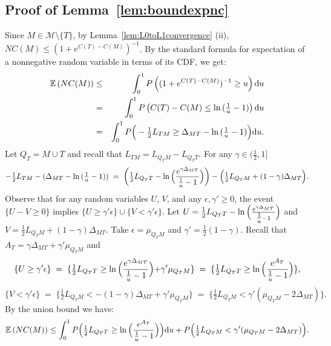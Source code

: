 \documentclass[aos]{imsart}
\theoremstyle{plain}
\newcommand{\E}{\mathbb{E}}
\begin{document}
\subsection{Proof of Lemma~\ref{lem:boundexpnc}}
Since $M\in \mathcal M\setminus \{T\}$, by Lemma~\ref{lem:L0toL1convergence} (ii),  $NC(M)\leq (1+e^{C(T)-C(M)})^{-1}$.  By the standard formula for expectation of a nonnegative random variable in terms of its CDF, we get:
\begin{eqnarray*}
  \E\left(NC(M)\right)  &\leq& \int_0^1 P\left((1+e^{C(T)-C(M)})^{-1}\geq u\right){\rm d} u\\
  &=&\int_0^1 P\left(C(T)-C(M) \leq \ln{(\tfrac1u-1)}\right){\rm d}u\\
  &=&\int_0^1 P\Big(-\tfrac12 L_{TM} \geq \Delta_{MT}-\ln{(\tfrac1u-1)}\Big) {\rm d}u.
\end{eqnarray*}
Let $Q_T=M \cup T$ and recall that $L_{TM}=L_{Q_TM}-L_{Q_TT}$. For any $\gamma\in (\frac{1}{2},1]$
$$
-\tfrac12 L_{TM} -(\Delta_{MT}-\ln{(\tfrac1u-1)})\;=\;\left(\tfrac12 L_{Q_TT}-\ln{\Bigl(\frac{e^{\gamma\Delta_{MT}}}{\tfrac1u-1}\Bigl)}\right)-\Bigl(\tfrac12 L_{Q_TM}+(1-\gamma)\Delta_{MT}\Bigl).
$$
Observe that for any random variables $U$, $V$, and any $\epsilon,\gamma' \geq 0$, the event $
\{U-V \geq 0\}$ implies $\{U \geq \gamma' \epsilon\}\cup
\{V  < \gamma' \epsilon\}$. Let $U=\tfrac12 L_{Q_TT}-\ln{\Bigl(\frac{e^{\gamma\Delta_{MT}}}{\tfrac1u-1}\Bigl)}$ and $V=\tfrac12 L_{Q_TM}+(1-\gamma)\Delta_{MT}$. Take $\epsilon=\mu_{Q_TM}$ and $\gamma'=\tfrac12({1-\gamma})$. Recall that $A_T=\gamma\Delta_{MT}+\gamma'\mu_{Q_TM}$ and
$$
\{U\geq \gamma'\epsilon\}\;=\;\{\tfrac12 L_{Q_TT}\geq \ln{\Bigl(\frac{e^{\gamma\Delta_{MT}}}{\tfrac1u-1}}\Bigl)+\gamma'\mu_{Q_TM}\}\;=\;\{\tfrac12 L_{Q_TT}\geq \ln{\Bigl(\frac{e^{A_T}}{\tfrac1u-1}}\Bigl)\},
$$
$$
\{V<\gamma'\epsilon\}\;=\;\{\tfrac12 L_{Q_TM}<-(1-\gamma)\Delta_{MT}+\gamma'\mu_{Q_TM}\}\;=\;\{\tfrac12 L_{Q_TM}<\gamma'(\mu_{Q_TM}-2\Delta_{MT})\}.
$$
By the union bound we have:
\begin{equation}\label{eq:prooflemmas20nonspu}
    \E\left(NC(M)\right)  \leq \int_0^1P\Bigl(\tfrac12 L_{Q_TT}\geq \ln{\Bigl(\frac{e^{A_T}}{\tfrac1u-1}\Bigl)}\Bigl){\rm d}u+ P\Bigl(\tfrac12 L_{Q_TM}<\gamma'(\mu_{Q_TM}-2\Delta_{MT})\Bigl).
\end{equation}
\end{document}
